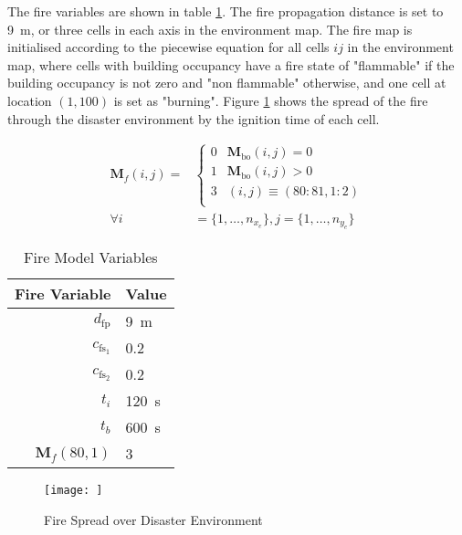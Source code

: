 \documentclass[conference]{IEEEtran}
\begin{document}

The fire variables are shown in table \ref{tab:settings_general_fire}.
The fire propagation distance is set to \SI{9}{\meter}, or three cells in each axis in the environment map.
The fire map is initialised according to the piecewise equation for all cells $ij$ in the environment map, where cells with building occupancy have a fire state of "flammable" if the building occupancy is not zero and "non flammable" otherwise, and one cell at location $(1,100)$ is set as "burning".
Figure \ref{fig:sim_fire_model} shows the spread of the fire through the disaster environment by the ignition time of each cell.

\begin{equation}
\label{eq:m_f_init_sim}
\begin{split}
    \bm{M}_{f}(i,j) = &
    \begin{cases} 
        0 & \bm{M}_{\text{bo}}(i,j) = 0 \\
        1 & \bm{M}_{\text{bo}}(i,j) > 0 \\
        3 & (i,j) \equiv (80:81,1:2) \\
    \end{cases} \\
    \forall i &= \{1, \ldots, n_{x_{e}}\}, j = \{1, \ldots, n_{y_{e}}\}
\end{split}
\end{equation}

\begin{table}[]
    \centering
    \caption{Fire Model Variables}
    \label{tab:settings_general_fire}
    \begin{tabular}{r|l}
    \toprule
        Fire Variable & Value \\
        \midrule
        $d_{\text{fp}} $            & \SI{9}{\meter} \\
        $c_{\text{fs}_{1}}$         & 0.2 \\
        $c_{\text{fs}_{2}}$         & 0.2  \\
        $t_{i}$                     & \SI{120}{\second} \\
        $t_{b}$                     & \SI{600}{\second} \\
        $\bm{M}_{f}(80,1)$          & 3\\
        \bottomrule
    \end{tabular}
\end{table}

\begin{figure}
    \centering
    \texttt{[image: ]}
    \caption{Fire Spread over Disaster Environment}
    \label{fig:sim_fire_model}
\end{figure}
\end{document}
